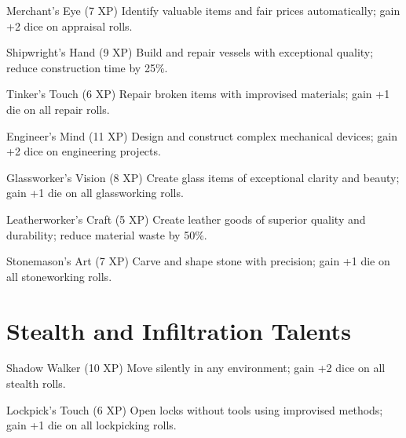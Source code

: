 \documentclass[11pt]{article}
\begin{document}
\begin{talentbox}{Merchant's Eye (7 XP)}
Identify valuable items and fair prices automatically; gain +2 dice on appraisal rolls.
\end{talentbox}

\begin{talentbox}{Shipwright's Hand (9 XP)}
Build and repair vessels with exceptional quality; reduce construction time by 25\%.
\end{talentbox}

\begin{talentbox}{Tinker's Touch (6 XP)}
Repair broken items with improvised materials; gain +1 die on all repair rolls.
\end{talentbox}

\begin{talentbox}{Engineer's Mind (11 XP)}
Design and construct complex mechanical devices; gain +2 dice on engineering projects.
\end{talentbox}

\begin{talentbox}{Glassworker's Vision (8 XP)}
Create glass items of exceptional clarity and beauty; gain +1 die on all glassworking rolls.
\end{talentbox}

\begin{talentbox}{Leatherworker's Craft (5 XP)}
Create leather goods of superior quality and durability; reduce material waste by 50\%.
\end{talentbox}

\begin{talentbox}{Stonemason's Art (7 XP)}
Carve and shape stone with precision; gain +1 die on all stoneworking rolls.
\end{talentbox}

\section*{Stealth and Infiltration Talents}

\begin{talentbox}{Shadow Walker (10 XP)}
Move silently in any environment; gain +2 dice on all stealth rolls.
\end{talentbox}

\begin{talentbox}{Lockpick's Touch (6 XP)}
Open locks without tools using improvised methods; gain +1 die on all lockpicking rolls.
\end{talentbox}
\end{document}
